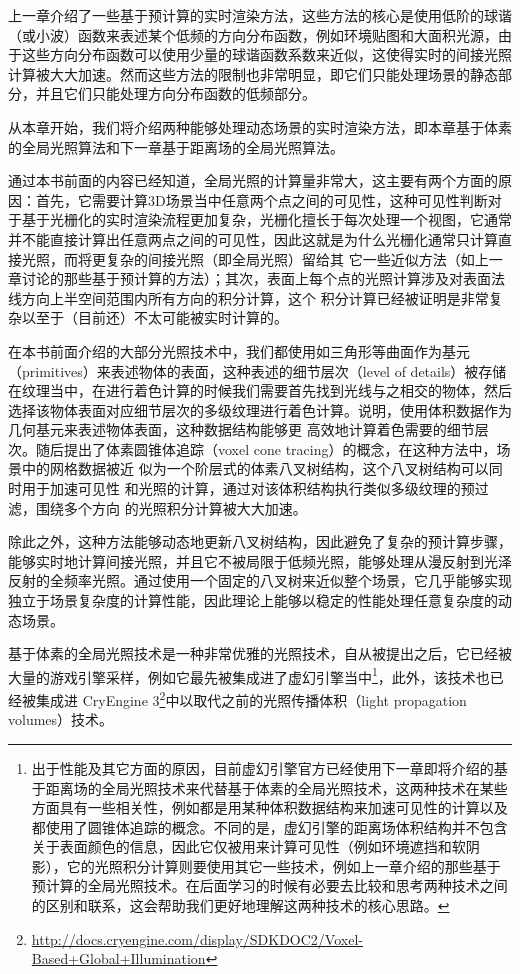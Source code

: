 上一章介绍了一些基于预计算的实时渲染方法，这些方法的核心是使用低阶的球谐（或小波）函数来表述某个低频的方向分布函数，例如环境贴图和大面积光源，由于这些方向分布函数可以使用少量的球谐函数系数来近似，这使得实时的间接光照计算被大大加速。然而这些方法的限制也非常明显，即它们只能处理场景的静态部分，并且它们只能处理方向分布函数的低频部分。

从本章开始，我们将介绍两种能够处理动态场景的实时渲染方法，即本章基于体素的全局光照算法和下一章基于距离场的全局光照算法。

通过本书前面的内容已经知道，全局光照的计算量非常大，这主要有两个方面的原因：首先，它需要计算3D场景当中任意两个点之间的可见性，这种可见性判断对于基于光栅化的实时渲染流程更加复杂，光栅化擅长于每次处理一个视图，它通常并不能直接计算出任意两点之间的可见性，因此这就是为什么光栅化通常只计算直接光照，而将更复杂的间接光照（即全局光照）留给其 它一些近似方法（如上一章讨论的那些基于预计算的方法）；其次，表面上每个点的光照计算涉及对表面法线方向上半空间范围内所有方向的积分计算，这个 积分计算已经被证明是非常复杂以至于（目前还）不太可能被实时计算的。

在本书前面介绍的大部分光照技术中，我们都使用如三角形等曲面作为基元（primitives）来表述物体的表面，这种表述的细节层次（level of details）被存储在纹理当中，在进行着色计算的时候我们需要首先找到光线与之相交的物体，然后选择该物体表面对应细节层次的多级纹理进行着色计算。\cite{a:GigaVoxels:RayGuidedStreamingforEfficientandDetailedVoxelRendering}说明，使用体积数据作为几何基元来表述物体表面，这种数据结构能够更 高效地计算着色需要的细节层次。随后\cite{a:InteractiveIndirectIlluminationUsingVoxelConeTracing}提出了体素圆锥体追踪（voxel cone tracing）的概念，在这种方法中，场景中的网格数据被近 似为一个阶层式的体素八叉树结构，这个八叉树结构可以同时用于加速可见性 和光照的计算，通过对该体积结构执行类似多级纹理的预过滤，围绕多个方向 的光照积分计算被大大加速。

除此之外，这种方法能够动态地更新八叉树结构，因此避免了复杂的预计算步骤，能够实时地计算间接光照，并且它不被局限于低频光照，能够处理从漫反射到光泽反射的全频率光照。通过使用一个固定的八叉树来近似整个场景，它几乎能够实现独立于场景复杂度的计算性能，因此理论上能够以稳定的性能处理任意复杂度的动态场景。

基于体素的全局光照技术是一种非常优雅的光照技术，自从被提出之后，它已经被大量的游戏引擎采样，例如它最先被集成进了虚幻引擎\cite{a:TheTechnologyBehindtheUnrealEngine4Elementaldemo}当中\footnote{出于性能及其它方面的原因，目前虚幻引擎官方已经使用下一章即将介绍的基于距离场的全局光照技术来代替基于体素的全局光照技术，这两种技术在某些方面具有一些相关性，例如都是用某种体积数据结构来加速可见性的计算以及都使用了圆锥体追踪的概念。不同的是，虚幻引擎的距离场体积结构并不包含关于表面颜色的信息，因此它仅被用来计算可见性（例如环境遮挡和软阴影），它的光照积分计算则要使用其它一些技术，例如上一章介绍的那些基于预计算的全局光照技术。在后面学习的时候有必要去比较和思考两种技术之间的区别和联系，这会帮助我们更好地理解这两种技术的核心思路。}，此外，该技术也已经被集成进 CryEngine 3\footnote{\url{http://docs.cryengine.com/display/SDKDOC2/Voxel-Based+Global+Illumination}}中以取代之前的光照传播体积（light propagation volumes）技术。



